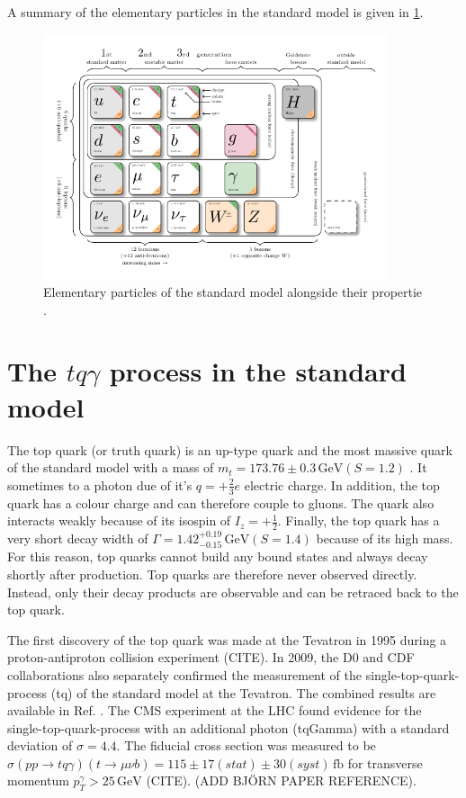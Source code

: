 A summary of the elementary particles in the standard model is given in \ref{fig:standard_model}.

\begin{figure}
    \centering
    \includegraphics[width=0.9\textwidth]{Plots/model-physics.pdf}
    \caption{Elementary particles of the standard model alongside their propertie \cite{sm_table}.}
    \label{fig:standard_model}
\end{figure}

\section{The \texorpdfstring{$tq\gamma$}{tqGamma} process in the standard model}


The top quark (or truth quark) is an up-type quark and the most massive quark of the standard model with a mass of $m_t = 173.76 \pm 0.3 \,\si{\giga\electronvolt} (S =1.2)$ \cite{pdg}. It sometimes to a photon due of it's $q = +\frac{2}{3}e$ electric charge. 
In addition, the top quark has a colour charge and can therefore couple to gluons. The quark also interacts weakly because of its isospin of $I_z = +\frac{1}{2}$. Finally, the top quark has a very short decay width of $\Gamma = 1.42^{+0.19}_{-0.15} \,\si{\giga\electronvolt} (S=1.4)$ \cite{pdg} because of its high mass.
For this reason, top quarks cannot build any bound states and always decay shortly after production. Top quarks are therefore never observed directly. Instead, only their decay products are observable and can be retraced back to the top quark. 

The first discovery of the top quark was made at the Tevatron in 1995 during a proton-antiproton collision experiment (CITE). In 2009, the D0 \cite{singletop1} and CDF \cite{singletop2} collaborations also separately confirmed the measurement of the single-top-quark-process (tq) of the standard model at the Tevatron. The combined results are available in Ref. \cite{singletop3}. 
The CMS experiment at the LHC found evidence for the single-top-quark-process with an additional photon (tqGamma) with a standard deviation of $\sigma = 4.4$. The fiducial cross section 
was measured to be $\sigma(pp\rightarrow tq\gamma)(t\rightarrow\mu \nu b) = 115 \pm 17 (stat) \pm 30 (syst) \,\si{\femto\barn}$ for transverse momentum $p_T^\gamma > 25 \,\si{\giga\electronvolt}$ (CITE). (ADD BJÖRN PAPER REFERENCE). 

